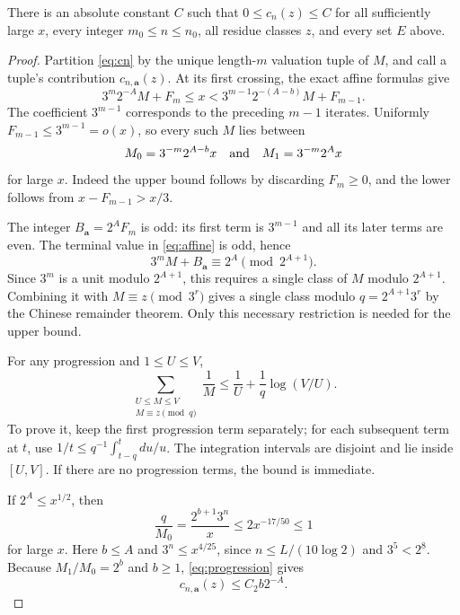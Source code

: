 \begin{proposition}\label{prop:cn}
There is an absolute constant $C$ such that $0\leq c_n(z)\leq C$
for all sufficiently large $x$, every integer $m_0\leq n\leq n_0$,
all residue classes $z$, and every set $E$ above.
\end{proposition}
\begin{proof}
Partition \eqref{eq:cn} by the unique length-$m$ valuation tuple of $M$,
and call a tuple's contribution $c_{n,\mathbf a}(z)$.  At its first
crossing, the exact affine formulas give
\[
 3^m2^{-A}M+F_m\leq x
 <3^{m-1}2^{-(A-b)}M+F_{m-1}.
\]
The coefficient $3^{m-1}$ corresponds to the preceding $m-1$ iterates.
Uniformly $F_{m-1}\leq3^{m-1}=o(x)$, so every such $M$ lies between
\begin{equation}\label{eq:M-bounds}
 M_0=3^{-m}2^{A-b}x\quad\hbox{and}\quad M_1=3^{-m}2^A x
\end{equation}
for large $x$.  Indeed the upper bound follows by discarding $F_m\geq0$,
and the lower follows from $x-F_{m-1}>x/3$.

The integer $B_{\mathbf a}=2^A F_m$ is odd: its first term is
$3^{m-1}$ and all its later terms are even.  The terminal value in
\eqref{eq:affine} is odd, hence
\[
 3^mM+B_{\mathbf a}\equiv2^A\pmod{2^{A+1}}.
\]
Since $3^m$ is a unit modulo $2^{A+1}$, this requires a single class of
$M$ modulo $2^{A+1}$.  Combining it with $M\equiv z\pmod{3^r}$ gives
a single class modulo $q=2^{A+1}3^r$ by the Chinese remainder theorem.
Only this necessary restriction is needed for the upper bound.

For any progression and $1\leq U\leq V$,
\begin{equation}\label{eq:progression}
 \sum_{\substack{U\leq M\leq V\\M\equiv z\pmod q}}\frac1M
 \leq\frac1U+\frac1q\log(V/U).
\end{equation}
To prove it, keep the first progression term separately; for each
subsequent term at $t$, use $1/t\leq q^{-1}\int_{t-q}^{t}du/u$.
The integration intervals are disjoint and lie inside $[U,V]$.
If there are no progression terms, the bound is immediate.

If $2^A\leq x^{1/2}$, then
\[
 \frac q{M_0}=\frac{2^{b+1}3^n}{x}\leq2x^{-17/50}\leq1
\]
for large $x$.  Here $b\leq A$ and $3^n\leq x^{4/25}$, since
$n\leq L/(10\log2)$ and $3^5<2^8$.
Because $M_1/M_0=2^b$ and $b\geq1$, \eqref{eq:progression} gives
\begin{equation}\label{eq:low}
 c_{n,\mathbf a}(z)\leq C_2 b2^{-A}.
\end{equation}


\end{proof}
